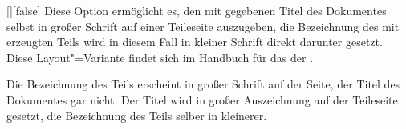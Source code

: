 \begin{Declaration}{[\PBoolean]}[false]%
\printdeclarationlist%
%
%
Diese Option ermöglicht es, den mit  gegebenen Titel des 
Dokumentes selbst in großer Schrift auf einer Teileseite auszugeben, die 
Bezeichnung des mit  erzeugten Teils wird 
in diesem Fall in kleiner Schrift direkt darunter gesetzt. Diese 
Layout"=Variante findet sich im Handbuch für das \CD der \TnUD. \notudscrartcl
%
\begin{values}
\itemfalse
  Die Bezeichnung des Teils erscheint in großer Schrift auf der Seite, der 
  Titel des Dokumentes gar nicht.
\itemtrue*
  Der Titel wird in großer Auszeichnung auf der Teileseite gesetzt, die 
  Bezeichnung des Teils selber in kleinerer.
\end{values}
\end{Declaration}


